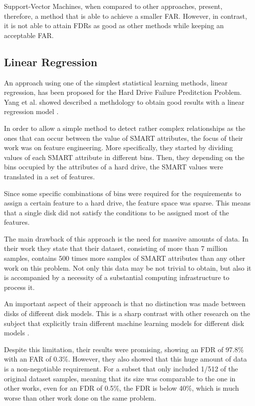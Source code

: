 Support-Vector Machines, when compared to other approaches, present, therefore, a method that is able to achieve a smaller FAR.
However, in contrast, it is not able to attain FDRs as good as other methods while keeping an acceptable FAR.

\subsection{Linear Regression}

An approach using one of the simplest statistical learning methods, linear regression, has been proposed for the Hard Drive Failure Preditction Problem.
Yang et al. showed described a methdology to obtain good results with a linear regression model \cite{yang2015hard}.

In order to allow a simple method to detect rather complex relationships as the ones that can occur between the value of SMART attributes, the focus of their work was on feature engineering.
More specifically, they started by dividing values of each SMART attribute in different bins.
Then, they depending on the bins occupied by the attributes of a hard drive, the SMART values were translated in a set of features.

Since some specific combinations of bins were required for the requirements to assign a certain feature to a hard drive, the feature space was sparse.
This means that a single disk did not satisfy the conditions to be assigned most of the features.

The main drawback of this approach is the need for massive amounts of data.
In their work they state that their dataset, consisting of more than 7 million samples, contains 500 times more samples of SMART attributes than any other work on this problem.
Not only this data may be not trivial to obtain, but also it is accompanied by a necessity of a substantial computing infrastructure to process it.

An important aspect of their approach is that no distinction was made between disks of different disk models.
This is a sharp contrast with other research on the subject that explicitly train different machine learning models for different disk models \cite{Xu16} \cite{Shen18} \cite{Li14}. 

Despite this limitation, their results were promising, showing an FDR of 97.8\% with an FAR of 0.3\%.
However, they also showed that this huge amount of data is a non-negotiable requirement.
For a subset that only included 1/512 of the original dataset samples, meaning that its size was comparable to the one in other works, even for an FDR of 0.5\%, the FDR is below 40\%, which is much worse than other work done on the same problem.

